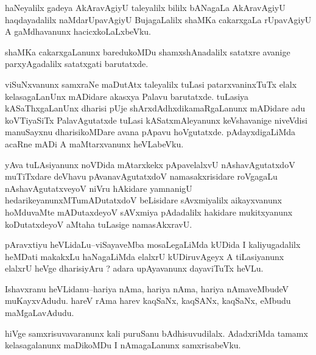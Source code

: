 \documentclass{article}
\begin{document}
\begin{mn}%
haNeyalilx gadeya AkAravAgiyU taleyalilx bililx bANagaLa AkAravAgiyU  haqdayadalilx 
naMdarUpavAgiyU BujagaLalilx shaMKa cakarxgaLa rUpavAgiyU A gaMdhavanunx hacicxkoLaLxbeVku.
\end{mn}

\begin{mn}%
shaMKa cakarxgaLanunx baredukoMDu shamxshAnadalilx satatxre avanige parxyAgadalilx satatxgati
barutatxde.
\end{mn}

\begin{mn}%
viSuNxvanunx samxraNe maDutAtx taleyalilx tuLasi patarxvaninxTuTx elalx kelasagaLanUnx 
mADidare akasxya Palavu barutatxde. tuLasiya kASaThxgaLanUnx dharisi pUje 
shArxdAdhxdikamaRgaLanunx mADidare adu koVTiyaSiTx PalavAgutatxde tuLasi kASatxmAleyanunx 
keVshavanige niveVdisi manuSayxnu dharisikoMDare avana pApavu hoVgutatxde. 
pAdayxdigaLiMda acaRne mADi A maMtarxvanunx heVLabeVku.
\end{mn}

\begin{mn}%
yAva tuLAsiyanunx noVDida mAtarxkekx pApavelalxvU nAshavAgutatxdoV muTiTxdare deVhavu 
pAvanavAgutatxdoV namasakxrisidare roVgagaLu nAshavAgutatxveyoV niVru hAkidare yamnanigU 
hedarikeyanunxMTumADutatxdoV beLisidare sAvxmiyalilx aikayxvanunx hoMduvaMte mADutaxdeyoV 
sAVxmiya pAdadalilx hakidare mukitxyanunx koDutatxdeyoV aMtaha tuLasige namasAkxravU.
\end{mn}


\begin{mn}%
pAravxtiyu heVLidaLu--viSayaveMba mosaLegaLiMda kUDida I kaliyugadalilx heMDati makakxLu 
haNagaLiMda elalxrU kUDiruvAgeyx A tiLasiyanunx elalxrU heVge dharisiyAru ? adara 
upAyavanunx dayaviTuTx heVLu.
\end{mn}

\begin{mn}%
Ishavxranu heVLidanu--hariya nAma, hariya nAma, hariya nAmaveMbudeV muKayxvAdudu. hareV rAma 
harev kaqSaNx, kaqSANx, kaqSaNx, eMbudu maMgaLavAdudu. 
\end{mn}

\begin{mn}%
hiVge samxrisuvavaranunx kali puruSanu bAdhisuvudilalx. AdadxriMda tamamx kelasagalanunx 
maDikoMDu I nAmagaLanunx samxrisabeVku.
\end{mn}
\end{document}
